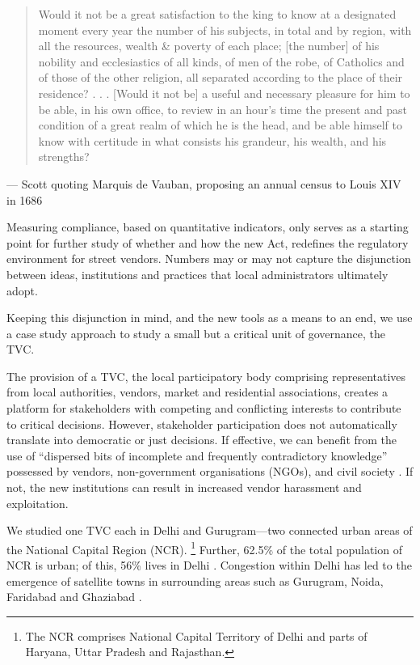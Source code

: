 \documentclass[a4paper, 12pt, twoside]{article}
\begin{document}
{\begin{quote}
Would it not be a great satisfaction to the king to know at a designated moment every year the number of his subjects, in total and by region, with all the resources, wealth \& poverty of each place; [the number] of his nobility and ecclesiastics of all kinds, of men of the robe, of Catholics and of those of the other religion, all separated according to the place of their residence? . . . [Would it not be] a useful and necessary pleasure for him to be able, in his own office, to review in an hour’s time the present and past condition of a great realm of which he is the head, and be able himself to know with certitude in what consists his grandeur, his wealth, and his strengths?
\end{quote}
— Scott \cite*{scottbook} quoting Marquis de Vauban, proposing an annual census to Louis XIV in 1686

Measuring compliance, based on quantitative indicators, only serves as a starting point for further study of whether and how the new Act, redefines the regulatory environment for street vendors. Numbers may or may not capture the disjunction between ideas, institutions and practices that local administrators ultimately adopt.

Keeping this disjunction in mind, and the new tools as a means to an end, we use a case study approach to study a small but a critical unit of governance, the TVC.

The provision of a TVC, the local participatory body comprising representatives from local authorities, vendors, market and residential associations, creates a platform for stakeholders with competing and conflicting interests to contribute to critical decisions. However, stakeholder participation does not automatically translate into democratic or just decisions. If effective, we can benefit from the use of “dispersed bits of incomplete and frequently contradictory knowledge” possessed by vendors, non-government organisations (NGOs), and civil society \parencite{hayekpaper}. If not, the new institutions can result in increased vendor harassment and exploitation.

We studied one TVC each in Delhi and Gurugram—two connected urban areas of the National Capital Region (NCR). \footnote{The NCR comprises National Capital Territory of Delhi and parts of Haryana, Uttar Pradesh and Rajasthan.} Further, 62.5\% of the total population of NCR is urban; of this, 56\% lives in Delhi \parencite{ncrpbreport}. Congestion within Delhi has led to the emergence of satellite towns in surrounding areas such as Gurugram, Noida, Faridabad and Ghaziabad \parencite{kpmgreport}.

}
\end{document}
